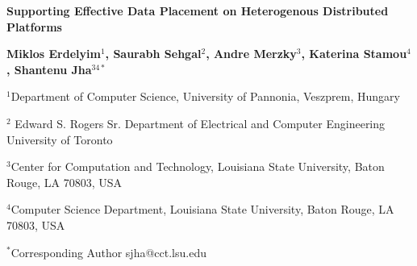 \documentclass[a4paper,11pt]{article}
\begin{document}
\begin{center}
\textbf {\Large \bf Supporting Effective Data Placement on Heterogenous Distributed Platforms}

\textbf {\normalsize \hspace{0.6 in} Miklos Erdelyim$^1$, Saurabh Sehgal$^2$, Andre Merzky$^3$,  \newline Katerina Stamou$^4$, Shantenu Jha$^{34*}$ }

\normalsize { \hspace{0.6 in} $^1$Department of Computer Science, University of Pannonia, Veszprem, Hungary}

\normalsize { \hspace{0.6 in} $^2$ Edward S. Rogers Sr. Department of Electrical and Computer Engineering  University of Toronto}

\normalsize { \hspace{0.6 in} $^3$Center for Computation and Technology, \newline Louisiana State University, Baton Rouge, LA 70803, USA}

\normalsize {\hspace{0.6 in} $^4$Computer Science Department, \newline Louisiana State University, Baton Rouge, LA 70803, USA}

{\footnotesize {\hspace{0.0 in} $^*$Corresponding Author sjha@cct.lsu.edu}}

\end{center}

\end{document}
